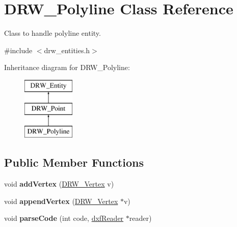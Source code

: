 \hypertarget{classDRW__Polyline}{\section{D\-R\-W\-\_\-\-Polyline Class Reference}
\label{classDRW__Polyline}
}


Class to handle polyline entity.  




{\ttfamily \#include $<$drw\-\_\-entities.\-h$>$}

Inheritance diagram for D\-R\-W\-\_\-\-Polyline\-:\begin{figure}[H]
\begin{center}
\leavevmode
\includegraphics[height=3.000000cm]{classDRW__Polyline}
\end{center}
\end{figure}
\subsection*{Public Member Functions}
\begin{DoxyCompactItemize}
\item 
\hypertarget{classDRW__Polyline_a715deac5f10bcd549374604907cc945e}{void {\bfseries add\-Vertex} (\hyperlink{classDRW__Vertex}{D\-R\-W\-\_\-\-Vertex} v)}\label{classDRW__Polyline_a715deac5f10bcd549374604907cc945e}

\item 
\hypertarget{classDRW__Polyline_a89b02a88fcb04c8b228aeec0df0b76e4}{void {\bfseries append\-Vertex} (\hyperlink{classDRW__Vertex}{D\-R\-W\-\_\-\-Vertex} $\ast$v)}\label{classDRW__Polyline_a89b02a88fcb04c8b228aeec0df0b76e4}

\item 
\hypertarget{classDRW__Polyline_a33d5703f2c214a75fad50f8b7e39f16c}{void {\bfseries parse\-Code} (int code, \hyperlink{classdxfReader}{dxf\-Reader} $\ast$reader)}\label{classDRW__Polyline_a33d5703f2c214a75fad50f8b7e39f16c}

\end{DoxyCompactItemize}
